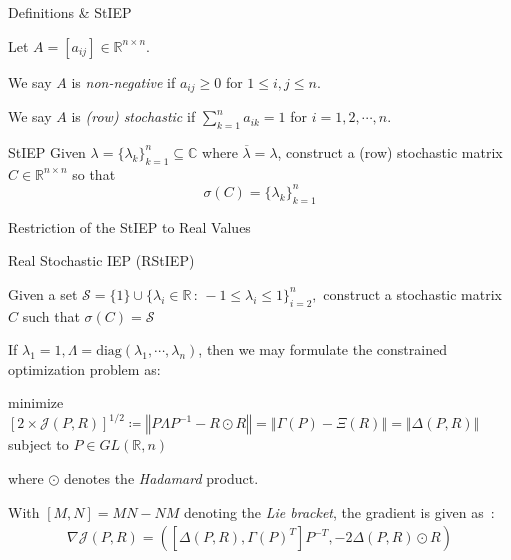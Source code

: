 \documentclass[handout]{beamer}
\begin{document}
\begin{frame}{Definitions \& StIEP}

  Let $A = \left[ a_{ij} \right] \in \mathbb{R}^{n \times n}$.

  \vspace{10pt}

  We say $A$ is \emph{non-negative} if $a_{ij} \geq 0$ for $1 \leq i,j \leq n$. \pause

  \vspace{10pt}

  We say $A$ is \emph{(row) stochastic} if $\sum_{k=1}^n a_{ik} = 1$ for $i = 1, 2, \cdots, n$. \pause

  \begin{titled-frame}{StIEP}
    Given $\lambda = \{ \lambda_k \}_{k=1}^{n} \subseteq \mathbb{C}$ where $\overline{\lambda} = \lambda$, construct a (row) stochastic matrix $C \in \mathbb{R}^{n \times n}$ so that $$\sigma(C) = \{ \lambda_k \}_{k=1}^n $$
  \end{titled-frame}

\end{frame}

\begin{frame}{Restriction of the StIEP to Real Values}

  \begin{titled-frame}{Real Stochastic IEP (RStIEP)}

    \centering

    Given a set $\mathcal{S} = \{1\} \cup \{ \lambda_i \in \mathbb{R} \,:\, -1 \leq \lambda_i \leq 1 \}_{i = 2}^n,$ construct a stochastic matrix $C$ such that $\sigma(C) = \mathcal{S}$

  \end{titled-frame} \pause

  If $\lambda_1 = 1, \Lambda = \text{diag}{(\lambda_1, \cdots, \lambda_n)}$, then we may formulate the constrained optimization problem as:

  \begin{center}
    minimize\\$\left[ 2 \times \mathcal{J}(P,R) \right]^{1/2} \coloneqq \left\Vert P \Lambda P^{-1} - R \odot R \right\Vert = \left\Vert \Gamma(P) - \Xi(R) \right\Vert = \Vert \Delta(P,R) \Vert$\\subject to $P \in GL(\mathbb{R},n) $
  \end{center}
  where $\odot$ denotes the \emph{Hadamard} product.

  \pause

  With $[M, N] = MN - NM$ denoting the \emph{Lie bracket}, the gradient is given as~\autocite{chuInverseEigenvalueProblems2005}:
  \begin{align*}
    \nabla \mathcal{J}(P,R) = \left( \left[ \Delta(P,R), \Gamma(P)^T \right] P^{-T}, -2 \Delta(P,R) \odot R \right)
  \end{align*}

\end{frame}
\end{document}
